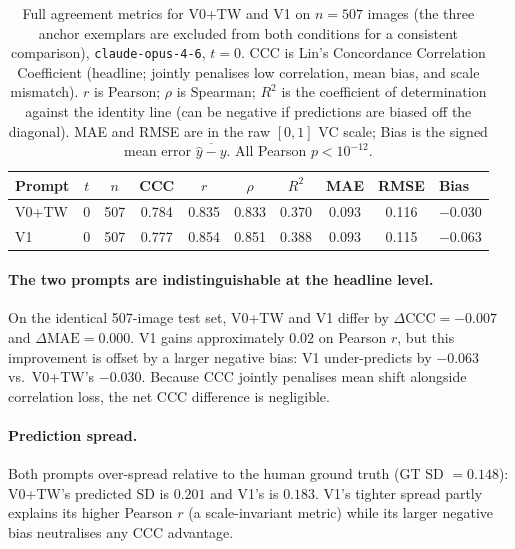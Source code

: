 \begin{table}[t]
  \centering
  \caption{Full agreement metrics for V0+TW and V1 on $n = 507$
    images (the three anchor exemplars are excluded from both conditions
    for a consistent comparison), \texttt{claude-opus-4-6}, $t = 0$.
    CCC is Lin's Concordance Correlation Coefficient (headline; jointly
    penalises low correlation, mean bias, and scale mismatch). $r$ is
    Pearson; $\rho$ is Spearman; $R^2$ is the coefficient of
    determination against the identity line (can be negative if
    predictions are biased off the diagonal). MAE and RMSE are in the
    raw $[0,1]$ VC scale; Bias is the signed mean error
    $\overline{\hat{y}-y}$. All Pearson $p < 10^{-12}$.}
  \label{tab:fullset-overall}
  \small
  \begin{tabular*}{\textwidth}{@{\extracolsep{\fill}}lcccccccc@{}}
    \toprule
    Prompt & $t$ & $n$ & CCC & $r$ & $\rho$ & $R^2$ & MAE & RMSE & Bias \\
    \midrule
    V0+TW & 0 & 507 & 0.784 & 0.835 & 0.833 & 0.370 & 0.093 & 0.116 & $-0.030$ \\
    V1    & 0 & 507 & 0.777 & 0.854 & 0.851 & 0.388 & 0.093 & 0.115 & $-0.063$ \\
    \bottomrule
  \end{tabular*}
\end{table}

\paragraph{The two prompts are indistinguishable at the headline level.}
On the identical 507-image test set, V0+TW and V1 differ by
$\Delta\mathrm{CCC} = -0.007$ and $\Delta\mathrm{MAE} = 0.000$.
V1 gains approximately $0.02$ on Pearson $r$, but this improvement is
offset by a larger negative bias: V1 under-predicts by $-0.063$ vs.\
V0+TW's $-0.030$. Because CCC jointly penalises mean shift alongside
correlation loss, the net CCC difference is negligible.

\paragraph{Prediction spread.}
Both prompts over-spread relative to the human ground truth (GT SD
$= 0.148$): V0+TW's predicted SD is $0.201$ and V1's is $0.183$. V1's
tighter spread partly explains its higher Pearson $r$ (a scale-invariant
metric) while its larger negative bias neutralises any CCC advantage.

